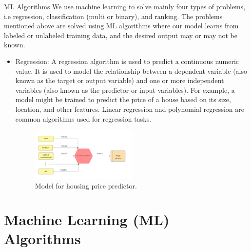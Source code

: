 \documentclass[11pt,notheorems,hyperref={pdfauthor=whatever}]{beamer}
\begin{document}
\begin{frame}{ML Algorithms}{}
We use machine learning  to solve mainly four types of problems, i.e regression, classification (multi or binary), and ranking. The problems mentioned above are solved using ML algorithms where our model learns from labeled or unlabeled training data, and the desired output may or may not be known.

\begin{itemize}
\item \alert{Regression:} A regression algorithm is used to predict a continuous numeric value. It is used to model the relationship between a dependent variable (also known as the target or output variable) and one or more independent variables (also known as the predictor or input variables). For example, a model might be trained to predict the price of a house based on its size, location, and other features. Linear regression and polynomial regression are common algorithms used for regression tasks.
\begin{figure}
    \centering
    \includegraphics[width=0.5\textwidth]{figures/regression.png}
    \caption{Model for housing price predictor.}
    \label{fig:regression}
\end{figure}
\end{itemize}
\end{frame}

\section{Machine Learning (ML) Algorithms}
\end{document}
